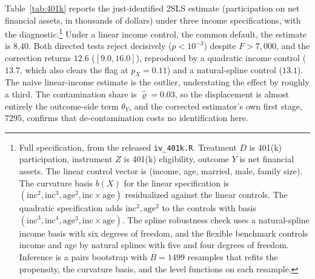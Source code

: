\documentclass[preprint,11pt,authoryear]{elsarticle}
\theoremstyle{definition}
\begin{document}
Table~\ref{tab:401k} reports the just-identified 2SLS estimate (participation on
net financial assets, in thousands of dollars) under three income
specifications, with the diagnostic.\footnote{Full specification, from the released
\texttt{iv\_401k.R}. Treatment $D$ is 401(k) participation, instrument $Z$ is 401(k)
eligibility, outcome $Y$ is net financial assets. The linear control vector is
(income, age, married, male, family size). The curvature basis $b(X)$ for the linear
specification is $(\mathrm{inc}^2,\mathrm{inc}^3,\mathrm{age}^2,\mathrm{inc}\times
\mathrm{age})$ residualized against the linear controls. The quadratic specification
adds $\mathrm{inc}^2,\mathrm{age}^2$ to the controls with basis
$(\mathrm{inc}^3,\mathrm{inc}^4,\mathrm{age}^3,\mathrm{inc}\times\mathrm{age})$. The
spline robustness check uses a natural-spline income basis with six degrees of
freedom, and the flexible benchmark controls income and age by natural splines with
five and four degrees of freedom. Inference is a pairs bootstrap with $B=1499$
resamples that refits the propensity, the curvature basis, and the level functions on
each resample.} Under a linear income control, the common default, the estimate is
$8.40$. Both directed tests reject decisively ($p<10^{-3}$) despite $F>7{,}000$,
and the correction returns $12.6$ ($[9.0,16.0]$), reproduced by a quadratic income
control ($13.7$, which also clears the flag at $p_X=0.11$) and a natural-spline control
($13.1$). The naive linear-income estimate is the outlier, understating the effect by
roughly a third. The contamination share is $\hat\varrho=0.03$, so the displacement is
almost entirely the outcome-side term $\theta_Y$, and the corrected estimator's own
first stage, $\num{7295}$, confirms that de-contamination costs no identification here.

\begin{table}[t]\centering
\caption{The 401(k) design ($n=9{,}275$). Effect of participation on net financial
assets (\$000s), instrumented by eligibility. A first-stage $F>7{,}000$ does not
prevent contamination under linear income control, and the correction recovers the
flexible-income answer. Test $p$-values from the pairs bootstrap. For the corrected
row, cond.\ $F$ is the corrected estimator's own first stage (regressing $D$ on the
residualized instrument $Z-\hat e(X)$), the bracketed interval is the pairs
bootstrap, and its identification-robust Anderson--Rubin $95\%$ interval is
$[8.2,17.0]$.}
\label{tab:401k}
\end{table}
\end{document}
